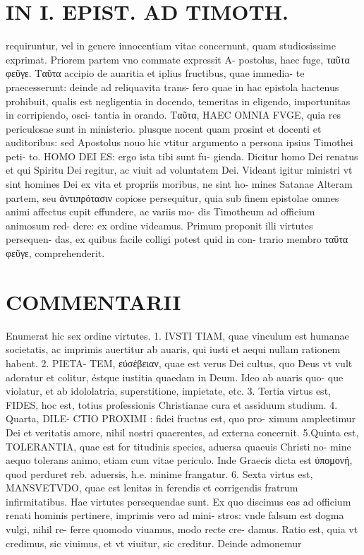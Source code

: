\documentclass{article}
\begin{document}
\begin{pages}
\section*{IN I. EPIST. AD TIMOTH. }
\marginpar{[ p.159 ]}\pstart requiruntur, vel in genere innocentiam vitae concernunt, quam studiosissime exprimat. Priorem partem vno commate expressit A- postolus, haec fuge, ταῦτα φεῦγε. Ταῦτα accipio de auaritia et iplius fructibus, quae immedia- te praecesserunt: deinde ad reliquavita trans- fero quae in hac epistola hactenus prohibuit, qualis est negligentia in docendo, temeritas in eligendo, importunitas in corripiendo, osci- tantia in orando. Ταῦτα, HAEC OMNIA FVGE, quia res periculosae sunt in ministerio. plusque nocent quam prosint et docenti et auditoribus: sed Apostolus nouo hic vtitur argumento a persona ipsius Timothei peti- to. HOMO DEI ES: ergo ista tibi sunt fu- gienda. Dicitur homo Dei renatus et qui Spiritu Dei regitur, ac viuit ad voluntatem Dei.  \pend\pstart Videant igitur ministri vt sint homines Dei ex vita et propriis moribus, ne sint ho- mines Satanae  \pend\pstart Alteram partem, seu ἀντιπρότασιν copiose persequitur, quia sub finem epistolae omnes animi affectus cupit effundere, ac variis mo- dis Timotheum ad officium animosum red- dere: ex ordine videamus.  \pend\pstart Primum proponit illi virtutes persequen- das, ex quibus facile colligi potest quid in con- trario membro ταῦτα φεῦγε, comprehenderit.  \pend
\section*{COMMENTARII }
\marginpar{[ p.160 ]}\pstart Enumerat hic sex ordine virtutes. 1. IVSTI TIAM, quae vinculum est humanae societatis, ac imprimis auertitur ab auaris, qui iusti et aequi nullam rationem habent. 2. PIETA- TEM, εὐσέβειαν, quae est verus Dei cultus, quo Deus vt vult adoratur et colitur, éstque iustitia quaedam in Deum. Ideo ab auaris quo- que violatur, et ab idololatria, superstitione, impietate, etc. 3. Tertia virtus est, FIDES, hoc est, totius professionis Christianae cura et assiduum studium. 4. Quarta, DILE- CTIO PROXIMI : fidei fructus est, quo pro- ximum amplectimur Dei et veritatis amore, nihil nostri quaerentes, ad externa concernit. 5.Quinta est, TOLERANTIA, quae est for titudinis species, aduersa quaeuis Christi no- mine aequo tolerans animo, etiam cum vitae periculo. Inde Graecis dicta est ὑπομονή, quod perduret reb. aduersis, h.e. minime frangatur. 6. Sexta virtus est, MANSVETVDO, quae est lenitas in ferendis et corrigendis fratrum infirmitatibus. Hae virtutes persequendae sunt. Ex quo discimus eas ad officium renati hominis pertinere, imprimis vero ad mini- stros: vnde falsum est dogma vulgi, nihil re- ferre quomodo viuamus, modo recte cre- damus.  \pend\pstart Ratio est, quia vt credimus, sic viuimus, et vt viuitur, sic creditur. Deinde admonemur  \pend

\end{pages}
\end{document}
